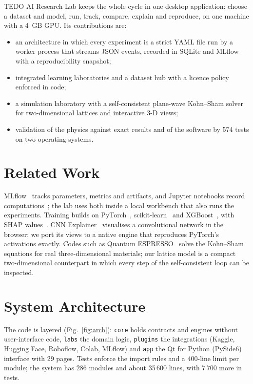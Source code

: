 \documentclass[conference]{IEEEtran}
\begin{document}
TEDO AI Research Lab keeps the whole cycle in one desktop application: choose a dataset and
model, run, track, compare, explain and reproduce, on one machine with a 4~GB GPU. Its
contributions are:
\begin{itemize}
\item an architecture in which every experiment is a strict YAML file run by a worker process
that streams JSON events, recorded in SQLite and MLflow with a reproducibility snapshot;
\item integrated learning laboratories and a dataset hub with a licence policy enforced in code;
\item a simulation laboratory with a self-consistent plane-wave Kohn--Sham
solver~\cite{kohn1965selfconsistent} for two-dimensional lattices and interactive 3-D views;
\item validation of the physics against exact results and of the software by 574 tests on two
operating systems.
\end{itemize}

\section{Related Work}
MLflow~\cite{zaharia2018mlflow} tracks parameters, metrics and artifacts, and Jupyter
notebooks record computations~\cite{kluyver2016jupyter}; the lab uses both inside a local
workbench that also runs the experiments. Training builds on PyTorch~\cite{paszke2019pytorch},
scikit-learn~\cite{pedregosa2011sklearn} and XGBoost~\cite{chen2016xgboost}, with SHAP
values~\cite{lundberg2017shap}. CNN Explainer~\cite{wang2021cnnexplainer} visualises a
convolutional network in the browser; we port its views to a native engine that reproduces
PyTorch's activations exactly. Codes such as Quantum ESPRESSO~\cite{giannozzi2009qe} solve the
Kohn--Sham equations for real three-dimensional materials; our lattice model is a compact
two-dimensional counterpart in which every step of the self-consistent loop can be inspected.

\section{System Architecture}
The code is layered (Fig.~\ref{fig:arch}): \texttt{core} holds contracts and engines without
user-interface code, \texttt{labs} the domain logic, \texttt{plugins} the integrations (Kaggle,
Hugging Face, Roboflow, Colab, MLflow) and \texttt{app} the Qt for Python (PySide6) interface with
29 pages. Tests enforce the import rules and a 400-line limit per module; the system has 286
modules and about 35\,600 lines, with 7\,700 more in tests.
\end{document}

